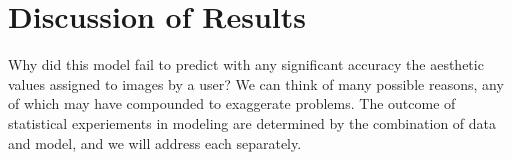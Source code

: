 \documentclass[midd]{thesis}
\begin{document}






























\chapter{Discussion of Results}

Why did this model fail to predict with any significant accuracy the aesthetic values assigned to images by a user? We can think of many possible reasons, any of which may have compounded to exaggerate problems. The outcome of statistical experiements in modeling are determined by the combination of data and model, and we will address each separately.
\end{document}
